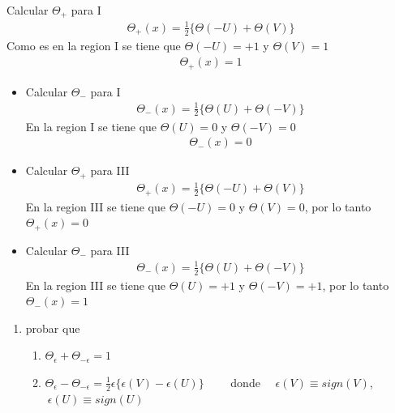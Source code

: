 \documentclass{article}
\newcommand{\caja}[3]{%
  \begin{tcolorbox}[colback=#1!5!white,colframe=#1!25!black,title=#2]
    #3
  \end{tcolorbox}%
}
\begin{document}
\caja{black}{Ejemplo }{
  Calcular $ \Theta _+ $ para I 
  \begin{gather*}
    \Theta_+(x) = \frac{1}{2} \{\Theta(-U) + \Theta(V )\} 
  \end{gather*}
  Como es en la region I se tiene que $ \Theta(-U ) = +1  $ y $ \Theta(V ) = 1  $
  \begin{gather*}
    \Theta_+ (x) = 1 
  \end{gather*}
}

\caja{red}{Ejercicio }{
  \begin{itemize}
    \item 
      Calcular $ \Theta_-  $ para I 
      \begin{gather*}
        \Theta_-(x) = \frac{1}{2} \{\Theta(U) + \Theta(-V )\} 
      \end{gather*}
      En la region I se tiene que $ \Theta(U) = 0  $ y $ \Theta(-V) = 0  $
      \begin{gather*}
        \Theta_-(x) = 0 
      \end{gather*}
    
    \item 
      Calcular $ \Theta_+  $ para III 
      \begin{gather*}
        \Theta_+(x) = \frac{1}{2} \{\Theta(-U) + \Theta(V )\} 
      \end{gather*}
      En la region III se tiene que $ \Theta(-U) = 0  $ y $ \Theta(V) = 0  $, por lo tanto $ \Theta_+(x) = 0  $\\
    
    \item 
      Calcular $ \Theta_-  $ para III 
      \begin{gather*}
        \Theta_-(x) = \frac{1}{2} \{\Theta(U) + \Theta(-V )\} 
      \end{gather*}
      En la region III se tiene que $ \Theta(U) = +1  $ y $ \Theta(-V) = +1  $, por lo tanto $ \Theta_-(x) = 1  $
  \end{itemize}
}


\caja{green}{Ejercicios para la casa}{
  \begin{enumerate}
    \item probar que 
      \begin{enumerate}
        \item $ \Theta_\epsilon + \Theta _{-\epsilon}  = 1  $
        
        \item $ \Theta_\epsilon - \Theta _{-\epsilon }  = \frac{1}{2}\epsilon\{\epsilon(V) - \epsilon(U) \} \qquad $ donde $\quad \epsilon(V) \equiv sign (V) $, $ \ \epsilon(U) \equiv sign(U) $
      \end{enumerate}
  \end{enumerate}
}
\end{document}
